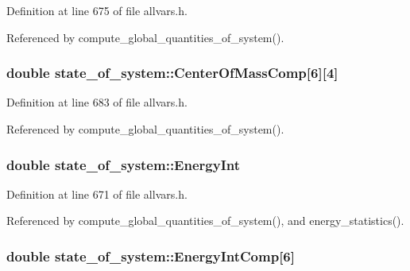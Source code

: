 Definition at line 675 of file allvars.h.



Referenced by compute\_\-global\_\-quantities\_\-of\_\-system().

\hypertarget{structstate__of__system_a828dd437a8be308919aa25633135a902}{
\subsubsection[{CenterOfMassComp}]{\setlength{\rightskip}{0pt plus 5cm}double {\bf state\_\-of\_\-system::CenterOfMassComp}\mbox{[}6\mbox{]}\mbox{[}4\mbox{]}}}
\label{structstate__of__system_a828dd437a8be308919aa25633135a902}


Definition at line 683 of file allvars.h.



Referenced by compute\_\-global\_\-quantities\_\-of\_\-system().

\hypertarget{structstate__of__system_a8ee567f49007a65817989a252d8c4f90}{
\subsubsection[{EnergyInt}]{\setlength{\rightskip}{0pt plus 5cm}double {\bf state\_\-of\_\-system::EnergyInt}}}
\label{structstate__of__system_a8ee567f49007a65817989a252d8c4f90}


Definition at line 671 of file allvars.h.



Referenced by compute\_\-global\_\-quantities\_\-of\_\-system(), and energy\_\-statistics().

\hypertarget{structstate__of__system_af96bea4b9655900eef6d7734629241a7}{
\subsubsection[{EnergyIntComp}]{\setlength{\rightskip}{0pt plus 5cm}double {\bf state\_\-of\_\-system::EnergyIntComp}\mbox{[}6\mbox{]}}}
\label{structstate__of__system_af96bea4b9655900eef6d7734629241a7}


